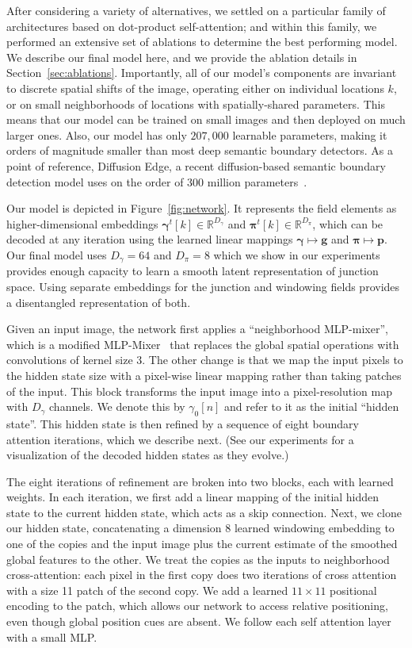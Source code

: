 \documentclass[main.tex]{subfiles}
\begin{document}
After considering a variety of alternatives, we settled on a particular family of architectures based on dot-product self-attention; and within this family, we performed an extensive set of ablations to determine the best performing model. We describe our final model here, and we provide the ablation details in Section~\ref{sec:ablations}. Importantly, all of our model's components are invariant to discrete spatial shifts of the image, operating either on individual locations $k$, or on small neighborhoods of locations with spatially-shared parameters. This means that our model can be trained on small images and then deployed on much larger ones. Also, our model has only $207,000$ learnable parameters, making it orders of magnitude smaller than most deep semantic boundary detectors. As a point of reference, Diffusion Edge, a recent diffusion-based semantic boundary detection model uses on the order of 300 million parameters~\cite{ye2024diffusionedgediffusionprobabilisticmodel}.

Our model is depicted in Figure~\ref{fig:network}. It represents the field elements as higher-dimensional embeddings $\boldsymbol{\gamma}^t[k]\in\mathbb{R}^{D_\gamma}$ and $\boldsymbol{\pi}^t[k]\in\mathbb{R}^{D_\pi}$, which can be decoded at any iteration using the learned linear mappings $\boldsymbol{\gamma}\mapsto \mathbf{g}$ and $\boldsymbol{\pi}\mapsto \mathbf{p}$. Our final model uses $D_\gamma = 64$ and $D_\pi = 8$ which we show in our experiments provides enough capacity to learn a smooth latent representation of junction space. Using separate embeddings for the junction and windowing fields provides a disentangled representation of both.

Given an input image, the network first applies a ``neighborhood MLP-mixer'', which is a modified MLP-Mixer~\cite{tolstikhin2021mlpmixer} that replaces the global spatial operations with convolutions of kernel size $3$. The other change is that we map the input pixels to the hidden state size with a pixel-wise linear mapping rather than taking patches of the input. This block transforms the input image into a pixel-resolution map with ${D_\gamma}$ channels. We denote this by $\gamma_0[n]$ and refer to it as the initial ``hidden state''. This hidden state is then refined by a sequence of eight boundary attention iterations, which we describe next. (See our experiments for a visualization of the decoded hidden states as they evolve.)

The eight iterations of refinement are broken into two blocks, each with learned weights. In each iteration, we first add a linear mapping of the initial hidden state to the current hidden state, which acts as a skip connection. Next, we clone our hidden state, concatenating a dimension 8 learned windowing embedding to one of the copies and the input image plus the current estimate of the smoothed global features to the other. We treat the copies as the inputs to neighborhood cross-attention: each pixel in the first copy does two iterations of cross attention with a size 11 patch of the second copy. We add a learned $11 \times 11$ positional encoding to the patch, which allows our network to access relative positioning, even though global position cues are absent. We follow each self attention layer with a small MLP.
\end{document}
